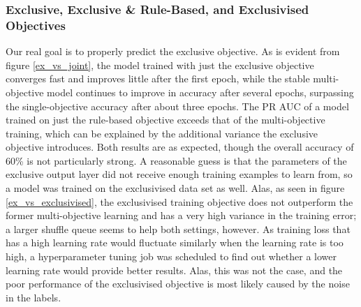 \subsubsection{Exclusive, Exclusive \& Rule-Based, and Exclusivised Objectives}

Our real goal is to properly predict the exclusive objective.
As is evident from figure \ref{ex_vs_joint}, the model trained with just the exclusive objective converges fast and improves little after the first epoch, while the stable multi-objective model continues to improve in accuracy after several epochs, surpassing the single-objective accuracy after about three epochs.
The PR AUC of a model trained on just the rule-based objective exceeds that of the multi-objective training, which can be explained by the additional variance the exclusive objective introduces.
Both results are as expected, though the overall accuracy of 60\% is not particularly strong.
A reasonable guess is that the parameters of the exclusive output layer did not receive enough training examples to learn from, so a model was trained on the exclusivised data set as well.
Alas, as seen in figure \ref{ex_vs_exclusivised}, the exclusivised training objective does not outperform the former multi-objective learning and has a very high variance in the training error; a larger shuffle queue seems to help both settings, however.
As training loss that has a high learning rate would fluctuate similarly when the learning rate is too high, a hyperparameter tuning job was scheduled to find out whether a lower learning rate would provide better results.
Alas, this was not the case, and the poor performance of the exclusivised objective is most likely caused by the noise in the labels.

